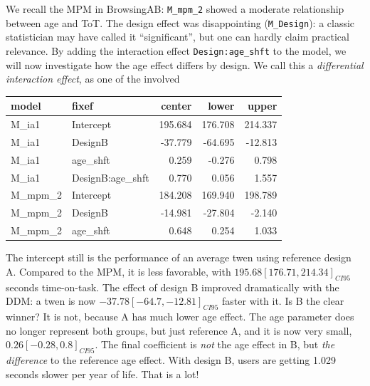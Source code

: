 \documentclass[]{svmono}
\newenvironment{Shaded}{\begin{snugshade}}{\end{snugshade}}
\newcommand{\KeywordTok}[1]{\textcolor[rgb]{0.13,0.29,0.53}{\textbf{#1}}}
\newcommand{\DataTypeTok}[1]{\textcolor[rgb]{0.13,0.29,0.53}{#1}}
\newcommand{\DecValTok}[1]{\textcolor[rgb]{0.00,0.00,0.81}{#1}}
\newcommand{\StringTok}[1]{\textcolor[rgb]{0.31,0.60,0.02}{#1}}
\newcommand{\CommentTok}[1]{\textcolor[rgb]{0.56,0.35,0.01}{\textit{#1}}}
\newcommand{\OperatorTok}[1]{\textcolor[rgb]{0.81,0.36,0.00}{\textbf{#1}}}
\newcommand{\NormalTok}[1]{#1}
\theoremstyle{definition}
\theoremstyle{definition}
\theoremstyle{definition}
\theoremstyle{remark}
\begin{document}
We recall the MPM in BrowsingAB: \texttt{M\_mpm\_2} showed a moderate
relationship between age and ToT. The design effect was disappointing
(\texttt{M\_Design}): a classic statistician may have called it
``significant'', but one can hardly claim practical relevance. By adding
the interaction effect \texttt{Design:age\_shft} to the model, we will
now investigate how the age effect differs by design. We call this a
\emph{differential interaction effect}, as one of the involved

\begin{Shaded}
\end{Shaded}

\begin{Shaded}
\end{Shaded}

\begin{longtable}[]{@{}llrrr@{}}
\toprule
model & fixef & center & lower & upper\tabularnewline
\midrule
\endhead
M\_ia1 & Intercept & 195.684 & 176.708 & 214.337\tabularnewline
M\_ia1 & DesignB & -37.779 & -64.695 & -12.813\tabularnewline
M\_ia1 & age\_shft & 0.259 & -0.276 & 0.798\tabularnewline
M\_ia1 & DesignB:age\_shft & 0.770 & 0.056 & 1.557\tabularnewline
M\_mpm\_2 & Intercept & 184.208 & 169.940 & 198.789\tabularnewline
M\_mpm\_2 & DesignB & -14.981 & -27.804 & -2.140\tabularnewline
M\_mpm\_2 & age\_shft & 0.648 & 0.254 & 1.033\tabularnewline
\bottomrule
\end{longtable}

The intercept still is the performance of an average twen using
reference design A. Compared to the MPM, it is less favorable, with
\(195.68 [176.71, 214.34]_{CI95}\) seconds time-on-task. The effect of
design B improved dramatically with the DDM: a twen is now
\(-37.78 [-64.7, -12.81]_{CI95}\) faster with it. Is B the clear winner?
It is not, because A has much lower age effect. The age parameter does
no longer represent both groups, but just reference A, and it is now
very small, \(0.26 [-0.28, 0.8]_{CI95}\). The final coefficient is
\emph{not} the age effect in B, but \emph{the difference} to the
reference age effect. With design B, users are getting 1.029 seconds
slower per year of life. That is a lot!
\end{document}
